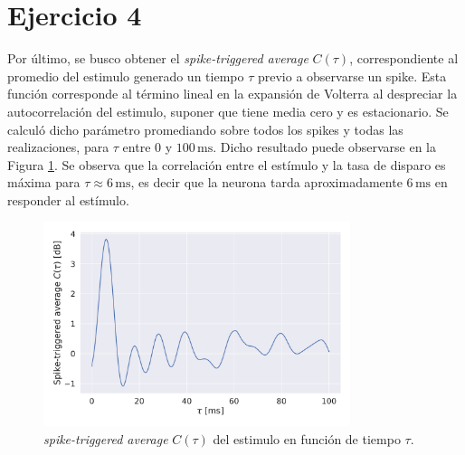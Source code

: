 \section*{Ejercicio 4}
\graphicspath{{Figuras/}}

Por último, se busco obtener el \textit{spike-triggered average} $C(\tau)$, correspondiente al promedio del estimulo generado un tiempo $\tau$ previo a observarse un spike. Esta función corresponde al término lineal en la expansión de Volterra al despreciar la autocorrelación del estimulo, suponer que tiene media cero y es estacionario. Se calculó dicho parámetro promediando sobre todos los spikes y todas las realizaciones, para $\tau$ entre $0$ y $100\,\text{ms}$. Dicho resultado puede observarse en la Figura \ref{04:fig:filtro}. Se observa que la correlación entre el estímulo y la tasa de disparo es máxima para $\tau \approx 6\,\text{ms}$, es decir que la neurona tarda aproximadamente $6\,\text{ms}$ en responder al estímulo.

\begin{figure}[t!]
    \centering
    \includegraphics[width=0.8\textwidth]{4_filtro.pdf}
    \caption{\textit{spike-triggered average} $C(\tau)$ del estimulo en función de tiempo $\tau$.}
    \label{04:fig:filtro}
\end{figure}


